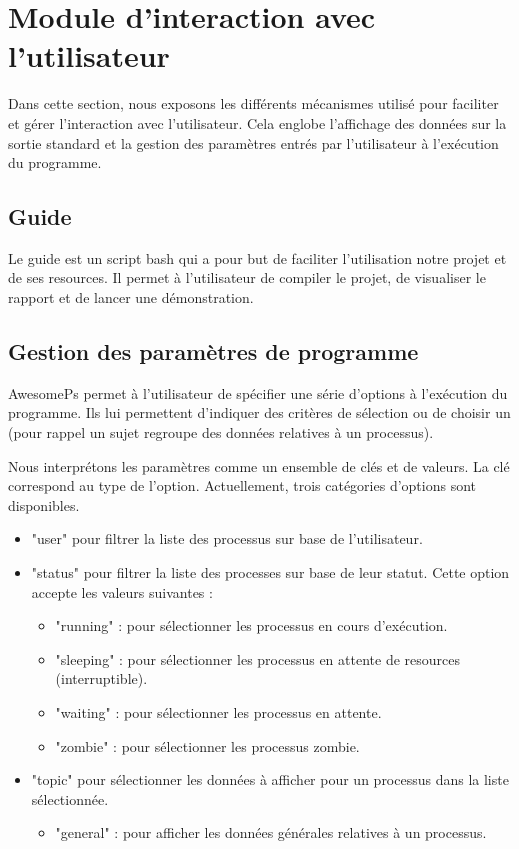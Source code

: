 \section{Module d'interaction avec l’utilisateur}
Dans cette section, nous exposons les différents mécanismes utilisé pour faciliter et gérer l’interaction avec l’utilisateur. Cela englobe l’affichage des données sur la sortie standard et la gestion des paramètres entrés par l’utilisateur à l’exécution du programme.

\subsection{Guide}
Le guide est un script bash qui a pour but de faciliter l'utilisation notre projet et de ses resources. Il permet à l'utilisateur de compiler le projet, de visualiser le rapport et de lancer une démonstration.

\subsection{Gestion des paramètres de programme}
AwesomePs permet à l'utilisateur de spécifier une série d'options à l'exécution du programme. Ils lui permettent d'indiquer des critères de sélection ou de choisir un  (pour rappel un sujet regroupe des données relatives à un processus).

Nous interprétons les paramètres comme un ensemble de clés et de valeurs. La clé correspond au type de l'option. Actuellement, trois catégories d'options sont disponibles.

\begin{itemize}
\item "user" pour filtrer la liste des processus sur base de l'utilisateur.
\item "status" pour filtrer la liste des processes sur base de leur statut. Cette option accepte les valeurs suivantes :
    \begin{itemize}
        \item "running" : pour sélectionner les processus en cours d'exécution.
        \item "sleeping" : pour sélectionner les processus en attente de resources (interruptible).
        \item "waiting" : pour sélectionner les processus en attente.
        \item "zombie" : pour sélectionner les processus zombie.
    \end{itemize}
\item "topic" pour sélectionner les données à afficher pour un processus dans la liste sélectionnée.
    \begin{itemize}
        \item "general" : pour afficher les données générales relatives à un processus.
    \end{itemize}
\end{itemize}


